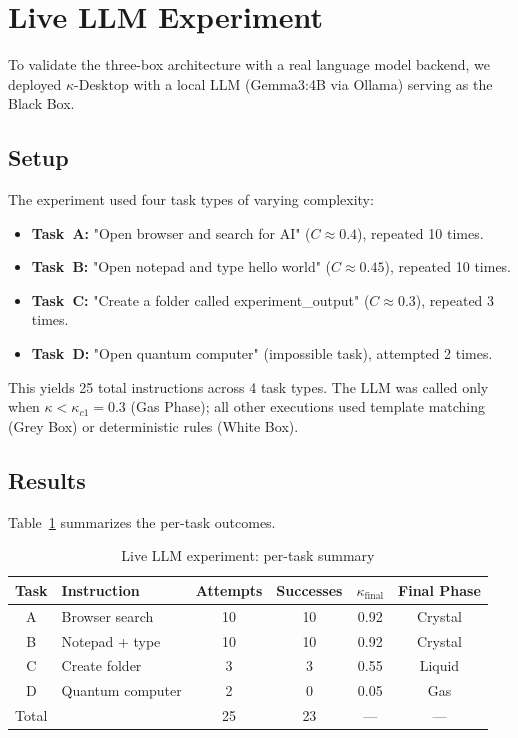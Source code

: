 \documentclass[10pt,twocolumn]{article}
\begin{document}
\vspace{1cm}

\section{Live LLM Experiment}
\label{sec:llm}

To validate the three-box architecture with a real
language model backend, we deployed $\kappa$-Desktop
with a local LLM (Gemma3:4B via Ollama) serving as the
Black Box.

\subsection{Setup}

The experiment used four task types of varying
complexity:

\begin{itemize}
  \item \textbf{Task~A:} "Open browser and search for
    AI" ($C \approx 0.4$), repeated 10 times.
  \item \textbf{Task~B:} "Open notepad and type hello
    world" ($C \approx 0.45$), repeated 10 times.
  \item \textbf{Task~C:} "Create a folder called
    experiment\_output" ($C \approx 0.3$), repeated
    3 times.
  \item \textbf{Task~D:} "Open quantum computer"
    (impossible task), attempted 2 times.
\end{itemize}

\noindent This yields 25 total instructions across 4
task types. The LLM was called only when
$\kappa < \kappa_{c1} = 0.3$ (Gas Phase); all other
executions used template matching (Grey Box) or
deterministic rules (White Box).

\subsection{Results}

Table~\ref{tab:llm_summary} summarizes the per-task
outcomes.

\begin{table}[htbp]
\centering
\caption{Live LLM experiment: per-task summary}
\label{tab:llm_summary}
\begin{tabular}{clcccc}
\toprule
Task & Instruction & Attempts & Successes &
  $\kappa_{\text{final}}$ & Final Phase \\
\midrule
A & Browser search   & 10 & 10 & 0.92 & Crystal \\
B & Notepad + type   & 10 & 10 & 0.92 & Crystal \\
C & Create folder    & 3  & 3  & 0.55 & Liquid \\
D & Quantum computer & 2  & 0  & 0.05 & Gas \\
\midrule
\multicolumn{2}{l}{Total} & 25 & 23 & --- & --- \\
\bottomrule
\end{tabular}
\end{table}
\end{document}
